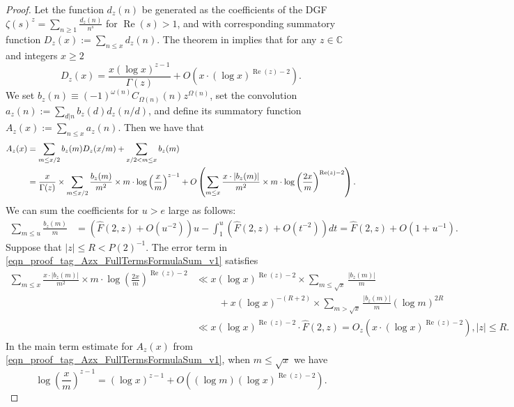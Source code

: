 \documentclass[11pt,reqno,a4letter]{article}
\numberwithin{figure}{section}
\numberwithin{table}{section}
\theoremstyle{plain}
\numberwithin{theorem}{section}
\theoremstyle{definition}
\renewcommand{\Re}{\operatorname{Re}}
\begin{document}
\begin{proof}
Let the function $d_z(n)$ be generated as the coefficients of the DGF 
$\zeta(s)^{z} = \sum_{n \geq 1} \frac{d_z(n)}{n^s}$ for $\Re(s) > 1$, and with corresponding 
summatory function $D_z(x) := \sum_{n \leq x} d_z(n)$. 
The theorem in \cite[Thm.\ 7.17; \S 7.4]{MV} implies that for any $z \in \mathbb{C}$ and 
integers $x \geq 2$ 
\[
D_z(x) = \frac{x (\log x)^{z-1}}{\Gamma(z)} + O\left(x \cdot (\log x)^{\Re(z)-2}\right). 
\]
We set 
$b_z(n) \equiv (-1)^{\omega(n)} C_{\Omega(n)}(n) z^{\Omega(n)}$, set the convolution 
$a_z(n) := \sum_{d|n} b_z(d) d_z(n/d)$, and define its summatory function 
$A_z(x) := \sum_{n \leq x} a_z(n)$. 
Then we have that 
\begin{align} 
\notag 
A_z(x) & = \sum_{m \leq x/2} b_z(m) D_z(x/m) + \sum_{x/2 < m \leq x} b_z(m) \\ 
\label{eqn_proof_tag_Azx_FullTermsFormulaSum_v1} 
     & = \frac{x}{\Gamma(z)} \times \sum_{m \leq x/2} 
     \frac{b_z(m)}{m^2} \times m \cdot \log\left(\frac{x}{m}\right)^{z-1} + 
     O\left(\sum_{m \leq x} \frac{x \cdot |b_z(m)|}{m^2} \times m \cdot 
     \log\left(\frac{2x}{m}\right)^{\Re(z) - 2}\right). 
\end{align} 
We can sum the coefficients for $u > e$ large as follows: 
\begin{align*} 
\sum_{m \leq u} \frac{b_z(m)}{m} & = \left(\widehat{F}(2, z) + O(u^{-2})\right) u - \int_1^{u} 
     \left(\widehat{F}(2, z) + O(t^{-2})\right) dt 
     = \widehat{F}(2, z) + O(1 + u^{-1}). 
\end{align*} 
Suppose that $|z| \leq R < P(2)^{-1}$. 
The error term in \eqref{eqn_proof_tag_Azx_FullTermsFormulaSum_v1} satisfies 
\begin{align*} 
\sum_{m \leq x} \frac{x \cdot |b_z(m)|}{m^2} \times m \cdot 
     \log\left(\frac{2x}{m}\right)^{\Re(z) - 2} & \ll 
     x (\log x)^{\Re(z) - 2} \times \sum_{m \leq \sqrt{x}} \frac{|b_z(m)|}{m} \\ 
     & \phantom{\ll x\ } + 
     x (\log x)^{-(R+2)} \times \sum_{m > \sqrt{x}} \frac{|b_z(m)|}{m} (\log m)^{2R} \\ 
     & \ll x (\log x)^{\Re(z) - 2} \cdot \widehat{F}(2, z) 
     = O_z\left(x \cdot (\log x)^{\Re(z) - 2}\right), |z| \leq R. 
\end{align*} 
In the main term estimate for $A_z(x)$ from 
\eqref{eqn_proof_tag_Azx_FullTermsFormulaSum_v1}, when $m \leq \sqrt{x}$ we have 
\[
\log\left(\frac{x}{m}\right)^{z-1} = (\log x)^{z-1} + 
     O\left((\log m) (\log x)^{\Re(z) - 2}\right). 
\]
\end{proof}
\end{document}
